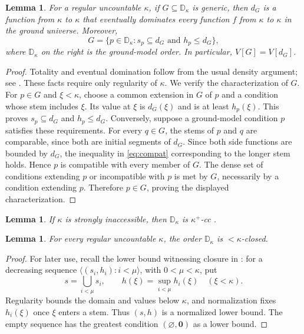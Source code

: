 \documentclass[10pt,a4paper]{amsart}
\newtheorem{lemma}[theorem]{Lemma}
\theoremstyle{definition}
\theoremstyle{remark}
\newcommand{\D}{\mathbb D}
\begin{document}
\begin{lemma}\label{lem:hechler-basic}
For a regular uncountable \(\kappa\), if
\(G\subseteq\D_\kappa\) is generic, then
\(d_G\) is a function from \(\kappa\) to \(\kappa\)
that eventually dominates every function \(f\) from
\(\kappa\) to \(\kappa\) in the ground universe. Moreover,
\[
 G=\{p\in\D_\kappa:s_p\subseteq d_G
                     \text{ and }h_p\leq d_G\},
\]
where \(\D_\kappa\) on the right is the ground-model order.
In particular, \(V[G]=V[d_G]\).
\end{lemma}
\begin{proof}
Totality and eventual domination follow from the usual density
argument; see \cite[Section~4.2]{BBFM}. These facts require only
regularity of \(\kappa\). We verify the characterization of \(G\).
For \(p\in G\) and \(\xi<\kappa\), choose a common extension
in \(G\) of \(p\) and a condition whose stem includes \(\xi\).
Its value at \(\xi\) is \(d_G(\xi)\) and is at least
\(h_p(\xi)\). This proves \(s_p\subseteq d_G\) and
\(h_p\leq d_G\). Conversely, suppose a ground-model condition
\(p\) satisfies these requirements. For every \(q\in G\), the
stems of \(p\) and \(q\) are comparable, since
both are initial segments of \(d_G\). Since both side functions
are bounded by \(d_G\), the inequality in \eqref{eq:compat}
corresponding to the longer stem holds. Hence \(p\) is compatible
with every member of \(G\). The dense set of conditions extending \(p\)
or incompatible with \(p\) is met by \(G\), necessarily by a
condition extending \(p\). Therefore \(p\in G\), proving the
displayed characterization.
\end{proof}

\begin{samepage}
\begin{lemma}\label{lem:hechler-cc}
If \(\kappa\) is strongly inaccessible, then \(\D_\kappa\) is
\(\kappa^+\)-cc \cite[Section~4.2]{BBFM}.
\end{lemma}
\end{samepage}

\begin{lemma}\label{lem:hechler-closure}
For every regular uncountable \(\kappa\), the order
\(\D_\kappa\) is \(<\kappa\)-closed.
\end{lemma}
\begin{proof}
For later use, recall the lower bound witnessing closure in
\cite[Section~4.2]{BBFM}: for a decreasing sequence
\(\langle(s_i,h_i):i<\mu\rangle\), with \(0<\mu<\kappa\), put
\[
 s=\bigcup_{i<\mu}s_i,\qquad
 h(\xi)=\sup_{i<\mu}h_i(\xi)\quad(\xi<\kappa).
\]
Regularity bounds the domain and values below \(\kappa\), and
normalization fixes \(h_i(\xi)\) once \(\xi\) enters a stem.
Thus \((s,h)\) is a normalized lower bound. The empty sequence
has the greatest condition \((\varnothing,\mathbf0)\) as a
lower bound.
\end{proof}
\end{document}

